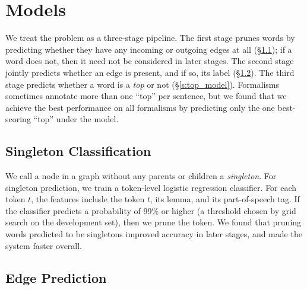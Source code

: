 \documentclass[11pt]{article}
\newcommand{\bocomment}[1]{\textcolor{Bittersweet}{[#1 -BTO]}}
\newcommand{\jdcomment}[1]{\textcolor{NavyBlue}{[#1 -JDD]}}
\renewcommand{\bocomment}[1]{}
\renewcommand{\jdcomment}[1]{}
\begin{document}
\section{Models} \label{s:models}

We treat the problem as a three-stage pipeline.
The first stage prunes words by predicting whether they have any incoming or
outgoing edges at all (\S\ref{s:singleton_model}); if a word does not, then it need not be 
considered in later stages.
The second stage jointly predicts whether an edge is
present, and if so, its label (\S\ref{s:edge_model}).
The third stage predicts whether a word is a \emph{top} or not
(\S\ref{s:top_model}).
Formalisms sometimes annotate more than one ``top'' per sentence, but we
found that we achieve the best performance on all formalisms by predicting only
the one best-scoring ``top'' under the model.
\bocomment{Singleton pruning does not matter for LogitEdge.  It doesn't affect accuracy, I'm pretty sure.  But it is essential for the graph model.}



\subsection{Singleton Classification} \label{s:singleton_model}

We call a node in a graph without any parents or children a \emph{singleton}.
For singleton prediction, we train a token-level logistic regression
classifier.
For each token $t$, the features include the token $t$, its lemma, and its
part-of-speech tag.
If the classifier predicts a probability of 99\% or higher (a
threshold chosen by grid search on the development set), then we prune the
token.
We found that pruning words predicted to be singletons improved accuracy in later stages, and made the system
faster overall.




\subsection{Edge Prediction} \label{s:edge_model}
\end{document}
